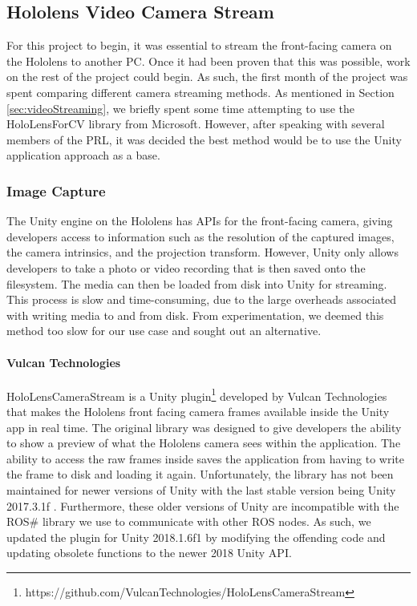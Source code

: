 \subsection{Hololens Video Camera Stream}
For this project to begin, it was essential to stream the front-facing camera on the Hololens to another PC. Once it had been proven that this was possible, work on the rest of the project could begin. As such, the first month of the project was spent comparing different camera streaming methods. As mentioned in Section \ref{sec:videoStreaming}, we briefly spent some time attempting to use the HoloLensForCV library from Microsoft. However, after speaking with several members of the PRL, it was decided the best method would be to use the Unity application approach as a base.

\subsubsection{Image Capture}
The Unity engine on the Hololens has APIs for the front-facing camera, giving developers access to information such as the resolution of the captured images, the camera intrinsics, and the projection transform. However, Unity only allows developers to take a photo or video recording that is then saved onto the filesystem. The media can then be loaded from disk into Unity for streaming. This process is slow and time-consuming, due to the large overheads associated with writing media to and from disk. From experimentation, we deemed this method too slow for our use case and sought out an alternative.

\paragraph{Vulcan Technologies} HoloLensCameraStream is a Unity plugin\footnote{https://github.com/VulcanTechnologies/HoloLensCameraStream} developed by Vulcan Technologies that makes the Hololens front facing camera frames available inside the Unity app in real time. The original library was designed to give developers the ability to show a preview of what the Hololens camera sees within the application. The ability to access the raw frames inside saves the application from having to write the frame to disk and loading it again. Unfortunately, the library has not been maintained for newer versions of Unity with the last stable version being Unity 2017.3.1f . Furthermore, these older versions of Unity are incompatible with the ROS\# library we use to communicate with other ROS nodes. As such, we updated the plugin for Unity 2018.1.6f1 by modifying the offending code and updating obsolete functions to the newer 2018 Unity API.

